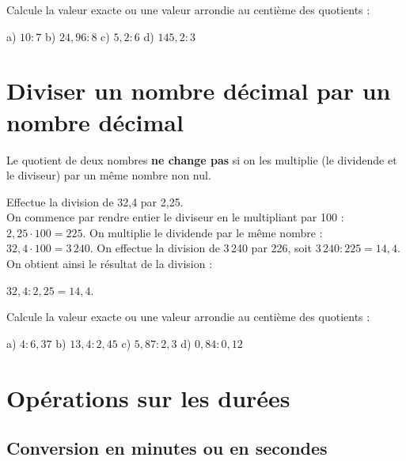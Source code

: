 
Calcule la valeur exacte ou une valeur arrondie au centième des quotients :

a) $10 : 7$ \hfill  b) $24,96 : 8$ \hfill c) $5,2 : 6$ \hfill d) $145,2 : 3$

\section{Diviser un nombre décimal par un nombre décimal}

\begin{aconnaitre}
Le quotient de deux nombres \textbf{ne change pas} si on les multiplie (le dividende et le diviseur) par un même nombre non nul.
\end{aconnaitre}

\begin{exemple*1}
Effectue la division de 32,4 par 2,25.\\[1em]

On commence par rendre entier le diviseur en le multipliant par 100 : $2,25 \cdot 100 = 225$. On multiplie le dividende par le même nombre : $32,4 \cdot 100 = 3\,240$. On effectue la division de 3\,240  par 226, soit $3\,240 : 225 = 14,4$. On obtient ainsi le résultat de la division :

$32,4 : 2,25 = 14,4$. 
\end{exemple*1}


Calcule la valeur exacte ou une valeur arrondie au centième des quotients :

a) $4 : 6,37$ \hfill b) $13,4 : 2,45$ \hfill c) $5,87 : 2,3$ \hfill d) $0,84 : 0,12$

\section{Opérations sur les durées} 

\subsection{Conversion en minutes ou en secondes}


